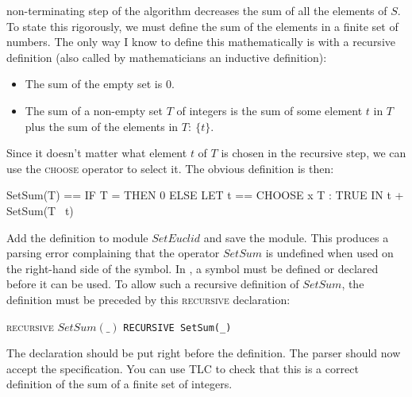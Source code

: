 \documentclass[fleqn,leqno]{article}
\begin{document}
non-terminating step of the algorithm decreases the sum of all the
elements of $S$.  To state this rigorously, we must define the sum of
the elements in a finite set of numbers.  The only way I know to define
this mathematically is with a 
recursive definition (also called by
mathematicians an 
inductive definition): 
\begin{itemize}
\item The sum of the empty set is 0.

\item The sum of a non-empty set $T$ of integers is the sum of some
element $t$ in $T$ plus the sum of the elements in $T :\: \{t\}$.
\end{itemize}
Since it doesn't matter what element $t$ of $T$ is chosen in the
recursive step, we can use the \textsc{choose} operator to select it.
The obvious definition is then:
\begin{display}
\begin{notla}
SetSum(T) == IF T = {} THEN 0
                       ELSE LET t == CHOOSE x \in T : TRUE
                            IN  t + SetSum(T \ {t}) 
\end{notla}
\begin{tlatex}
%
%
\end{tlatex}
\end{display}
Add the definition to module $SetEuclid$ and save the module.  This
produces a parsing error complaining that the operator $SetSum$ is
undefined when used on the right-hand side of the symbol.  In \tlaplus,
a symbol must be defined or declared before it can be used.  To allow
such a recursive definition of $SetSum$, the definition must be preceded
by this \textsc{recursive} declaration:
\begin{display}
\begin{twocols}
\textsc{recursive} $SetSum(\_)$
\midcol
\verb|RECURSIVE SetSum(_)|
\end{twocols}
\end{display}
The declaration should be put right before the definition.
%
The parser should now accept the specification.  You can use TLC
to check that this is a correct definition of the sum of a finite
set of integers.
\end{document}
